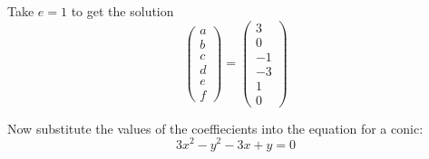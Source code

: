 Take $e = 1$ to get the solution
\[
 \begin{pmatrix} a \\ b \\ c \\ d \\ e \\ f \end{pmatrix} 
 =
 \begin{pmatrix} 3 \\ 0 \\ -1 \\ -3 \\ 1 \\ 0 \end{pmatrix}
\]

Now substitute the values of the coeffiecients into the equation for a conic:
\[ 3x^2 - y^2 - 3x + y = 0 \]

